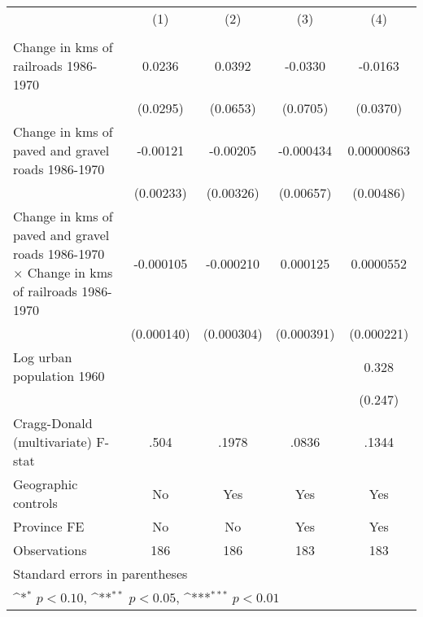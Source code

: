 {
\def\sym#1{\ifmmode^{#1}\else\(^{#1}\)\fi}
\begin{tabular}{l*{4}{c}}
\hline\hline
                &\multicolumn{1}{c}{(1)}&\multicolumn{1}{c}{(2)}&\multicolumn{1}{c}{(3)}&\multicolumn{1}{c}{(4)}\\
                &\multicolumn{1}{c}{}&\multicolumn{1}{c}{}&\multicolumn{1}{c}{}&\multicolumn{1}{c}{}\\
\hline
Change in kms of railroads 1986-1970&   0.0236         &   0.0392         &  -0.0330         &  -0.0163         \\
                & (0.0295)         & (0.0653)         & (0.0705)         & (0.0370)         \\
[1em]
Change in kms of paved and gravel roads 1986-1970& -0.00121         & -0.00205         &-0.000434         &0.00000863         \\
                &(0.00233)         &(0.00326)         &(0.00657)         &(0.00486)         \\
[1em]
Change in kms of paved and gravel roads 1986-1970 $\times$ Change in kms of railroads 1986-1970&-0.000105         &-0.000210         & 0.000125         &0.0000552         \\
                &(0.000140)         &(0.000304)         &(0.000391)         &(0.000221)         \\
[1em]
Log urban population 1960&                  &                  &                  &    0.328         \\
                &                  &                  &                  &  (0.247)         \\
\hline
Cragg-Donald (multivariate) F-stat&     .504         &    .1978         &    .0836         &    .1344         \\
Geographic controls&       No         &      Yes         &      Yes         &      Yes         \\
Province FE     &       No         &       No         &      Yes         &      Yes         \\
Observations    &      186         &      186         &      183         &      183         \\
\hline\hline
\multicolumn{5}{l}{\footnotesize Standard errors in parentheses}\\
\multicolumn{5}{l}{\footnotesize \sym{*} \(p<0.10\), \sym{**} \(p<0.05\), \sym{***} \(p<0.01\)}\\
\end{tabular}
}
